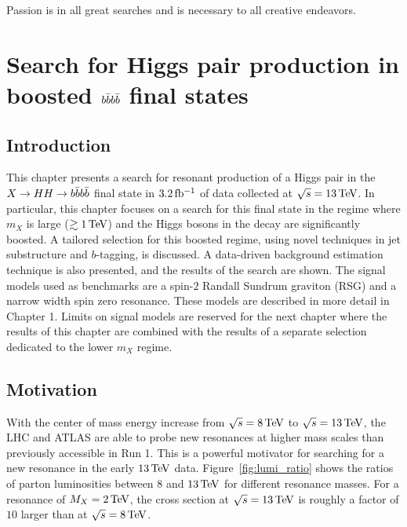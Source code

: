 \begin{savequote}[75mm]
Passion is in all great searches and is necessary to all creative endeavors.
\end{savequote}

\chapter{Search for Higgs pair production in boosted $b\bar{b}b\bar{b}$ final states}
\label{chap:boosted4b}

\section{Introduction}

This chapter presents a search for resonant production of a Higgs pair in the $X\to HH \to b\bar{b}b\bar{b}$ final state in $3.2 \mbox{\,fb$^{-1}$}$ of data collected at $\sqrt{s} = 13 \TeV$. In particular, this chapter focuses on a search for this final state in the regime where $m_{X}$ is large ($\gtrsim 1 \TeV$) and the Higgs bosons in the decay are significantly boosted. A tailored selection for this boosted regime, using novel techniques in jet substructure and $b$-tagging, is discussed. A data-driven background estimation technique is also presented, and the results of the search are shown. The signal models used as benchmarks are a spin-$2$ Randall Sundrum graviton (RSG) and a narrow width spin zero resonance. These models are described in more detail in Chapter 1. Limits on signal models are reserved for the next chapter where the results of this chapter are combined with the results of a separate selection dedicated to the lower $m_X$ regime. 

\section{Motivation}

With the center of mass energy increase from $\sqrt{s} = 8 \TeV$ to $\sqrt{s} = 13 \TeV$, the LHC and ATLAS are able to probe new resonances at higher mass scales than previously accessible in Run 1. This is a powerful motivator for searching for a new resonance in the early $13 \TeV$ data. Figure~\ref{fig:lumi_ratio} shows the ratios of parton luminosities between $8$ and $13 \TeV$ for different resonance masses. For a resonance of $M_{X} = 2 \TeV$, the cross section at $\sqrt{s} = 13 \TeV$ is roughly a factor of $10$ larger than at $\sqrt{s} = 8 \TeV$. 

